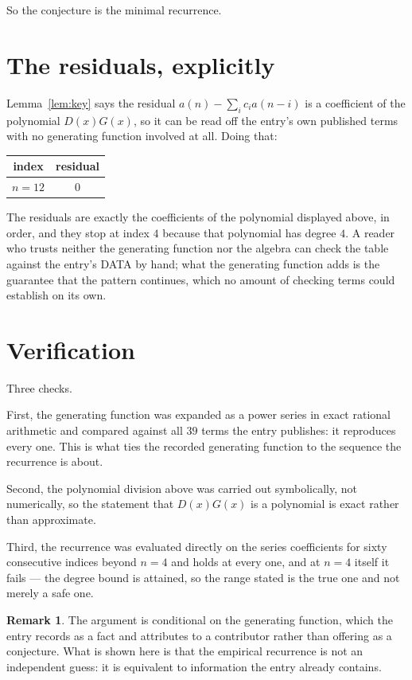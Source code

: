 \documentclass[11pt,a4paper]{article}
\theoremstyle{plain}
\theoremstyle{definition}
\newtheorem{remark}[theorem]{Remark}
\begin{document}
So the conjecture is the minimal recurrence.

\section{The residuals, explicitly}

Lemma~\ref{lem:key} says the residual $a(n)-\sum_ic_ia(n-i)$ is a coefficient of the
polynomial $D(x)G(x)$, so it can be read off the entry's own published terms with no
generating function involved at all. Doing that:
\begin{center}
\begin{tabular}{cc}
index & residual \\ \hline
$n=12$ & $0$
\end{tabular}
\end{center}
The residuals are exactly the coefficients of the polynomial displayed above, in order, and
they stop at index $4$ because that polynomial has degree $4$. A reader who trusts
neither the generating function nor the algebra can check the table against the entry's DATA
by hand; what the generating function adds is the guarantee that the pattern continues, which
no amount of checking terms could establish on its own.

\section{Verification}

Three checks.

First, the generating function was expanded as a power series in exact rational arithmetic and
compared against all $39$ terms the entry publishes: it reproduces every one. This is
what ties the recorded generating function to the sequence the recurrence is about.

Second, the polynomial division above was carried out symbolically, not numerically, so the
statement that $D(x)G(x)$ is a polynomial is exact rather than approximate.

Third, the recurrence was evaluated directly on the series coefficients for sixty consecutive
indices beyond $n=4$ and holds at every one, and at $n=4$ itself it fails --- the
degree bound is attained, so the range stated is the true one and not merely a safe one.

\begin{remark}
The argument is conditional on the generating function, which the entry records as a fact and
attributes to a contributor rather than offering as a conjecture. What is shown here is that
the empirical recurrence is not an independent guess: it is equivalent to information the
entry already contains.
\end{remark}
\end{document}
